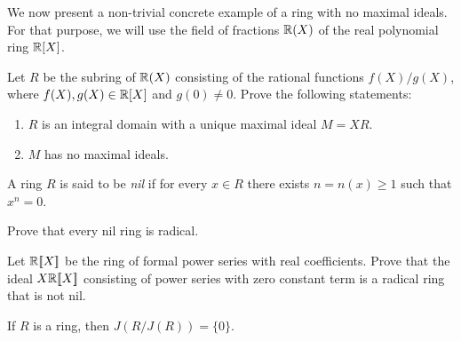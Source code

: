 We now present a non-trivial concrete example of a ring 
with no maximal ideals. For that purpose, we will use
the field of fractions $\mathbb{R}(X)$ of the real polynomial ring $\mathbb{R}[X]$.  

\begin{exercise}
    \label{xca:example}
    Let $R$ be the subring of $\mathbb{R}(X)$ consisting of the rational functions
    $f(X)/g(X)$, where $f(X),g(X)\in\mathbb{R}[X]$ and $g(0)\ne0$.
    Prove the following statements:
    \begin{enumerate}
        \item $R$ is an integral domain with a unique maximal ideal $M=XR$.
        \item $M$ has no maximal ideals. 
    \end{enumerate}  
\end{exercise}


\begin{definition}
A ring $R$ is said to be \emph{nil} if for every $x\in R$ there
exists $n=n(x)\geq1$ such that $x^n=0$. 
\end{definition}

\begin{exercise}
    Prove that every nil ring is radical.
\end{exercise}

\begin{exercise}
    Let $\mathbb{R}[\![X]\!]$ be the ring of formal power series with real coefficients. Prove that the ideal 
    $X\mathbb{R}[\![X]\!]$ consisting of power series with zero constant term is a radical ring
    that is not nil. 
\end{exercise}

\begin{theorem}
	\label{thm:J(R/J)=0}
	If $R$ is a ring, then $J(R/J(R))=\{0\}$.
\end{theorem}

